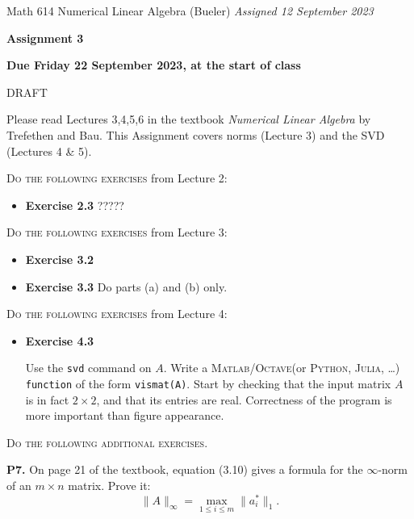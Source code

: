 \documentclass[12pt]{amsart}
\newcommand{\prob}[1]{\bigskip\noindent\textbf{#1.}\quad }
\newcommand{\Matlab}{\textsc{Matlab}\xspace}
\newcommand{\Octave}{\textsc{Octave}\xspace}
\newcommand{\Python}{\textsc{Python}\xspace}
\newcommand{\Julia}{\textsc{Julia}\xspace}
\begin{document}
\scriptsize \noindent Math 614 Numerical Linear Algebra (Bueler) \hfill \emph{Assigned 12 September 2023}
\normalsize\medskip

\Large\centerline{\textbf{Assignment 3}}
\large
\medskip

\centerline{\textbf{Due Friday 22 September 2023, at the start of class}}
\medskip
\normalsize

\thispagestyle{empty}

{\huge DRAFT}

\bigskip
\noindent Please read Lectures 3,4,5,6 in the textbook \emph{Numerical Linear Algebra} by Trefethen and Bau.  This Assignment covers norms (Lecture 3) and the SVD (Lectures 4 \& 5).

\bigskip
\noindent \textsc{Do the following exercises} from Lecture 2:

\begin{itemize}
\item \textbf{Exercise 2.3} ?????
\end{itemize}

\bigskip
\noindent \textsc{Do the following exercises} from Lecture 3:

\begin{itemize}
\item \textbf{Exercise 3.2}
\item \textbf{Exercise 3.3}  Do parts (a) and (b) only.
\end{itemize}

\bigskip
\noindent \textsc{Do the following exercises} from Lecture 4:

\begin{itemize}
\item \textbf{Exercise 4.3}  \begin{minipage}[t]{0.68\textwidth}
Use the \texttt{svd} command on $A$.  Write a \Matlab/\Octave (or \Python, \Julia, \dots) \texttt{function} of the form \texttt{vismat(A)}.  Start by checking that the input matrix $A$ is in fact $2\times 2$, and that its entries are real.  Correctness of the program is more important than figure appearance.
\end{minipage}
\end{itemize}


\bigskip
\noindent \textsc{Do the following additional exercises.}

\prob{P7}  On page 21 of the textbook, equation (3.10) gives a formula for the $\infty$-norm of an $m\times n$ matrix.  Prove it:
    $$\|A\|_\infty = \max_{1\le i \le m} \|a_i^*\|_1.$$
\end{document}
